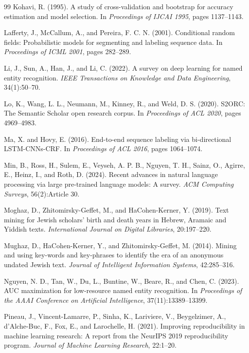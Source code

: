 \documentclass[11pt,a4paper]{article}
\begin{document}
\begin{thebibliography}{99}
Kohavi, R. (1995).
A study of cross-validation and bootstrap for accuracy estimation and model selection.
In \emph{Proceedings of IJCAI 1995}, pages 1137--1143.

Lafferty, J., McCallum, A., and Pereira, F. C. N. (2001).
Conditional random fields: Probabilistic models for segmenting and labeling sequence data.
In \emph{Proceedings of ICML 2001}, pages 282--289.

Li, J., Sun, A., Han, J., and Li, C. (2022).
A survey on deep learning for named entity recognition.
\emph{IEEE Transactions on Knowledge and Data Engineering}, 34(1):50--70.

Lo, K., Wang, L. L., Neumann, M., Kinney, R., and Weld, D. S. (2020).
S2ORC: The Semantic Scholar open research corpus.
In \emph{Proceedings of ACL 2020}, pages 4969--4983.

Ma, X. and Hovy, E. (2016).
End-to-end sequence labeling via bi-directional LSTM-CNNs-CRF.
In \emph{Proceedings of ACL 2016}, pages 1064--1074.

Min, B., Ross, H., Sulem, E., Veyseh, A. P. B., Nguyen, T. H., Sainz, O., Agirre, E., Heinz, I., and Roth, D. (2024).
Recent advances in natural language processing via large pre-trained language models: A survey.
\emph{ACM Computing Surveys}, 56(2):Article 30.

Moghaz, D., Zhitomirsky-Geffet, M., and HaCohen-Kerner, Y. (2019).
Text mining for Jewish scholars' birth and death years in Hebrew, Aramaic and Yiddish texts.
\emph{International Journal on Digital Libraries}, 20:197--220.

Mughaz, D., HaCohen-Kerner, Y., and Zhitomirsky-Geffet, M. (2014).
Mining and using key-words and key-phrases to identify the era of an anonymous undated Jewish text.
\emph{Journal of Intelligent Information Systems}, 42:285--316.

Nguyen, N. D., Tan, W., Du, L., Buntine, W., Beare, R., and Chen, C. (2023).
AUC maximization for low-resource named entity recognition.
In \emph{Proceedings of the AAAI Conference on Artificial Intelligence}, 37(11):13389--13399.

Pineau, J., Vincent-Lamarre, P., Sinha, K., Lariviere, V., Beygelzimer, A., d'Alche-Buc, F., Fox, E., and Larochelle, H. (2021).
Improving reproducibility in machine learning research: A report from the NeurIPS 2019 reproducibility program.
\emph{Journal of Machine Learning Research}, 22:1--20.


\end{thebibliography}
\end{document}
